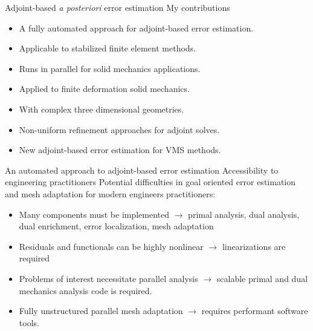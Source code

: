 \documentclass[fleqn]{beamer}
\begin{document}
\begin{frame}{Adjoint-based \emph{a posteriori} error estimation}
{My contributions}
\begin{itemize}
\item A fully automated approach for adjoint-based error estimation.
\item Applicable to stabilized finite element methods.
\item Runs in parallel for solid mechanics applications.
\item Applied to finite deformation solid mechanics.
\item With complex three dimensional geometries.
\item Non-uniform refinement approaches for adjoint solves.
\item New adjoint-based error estimation for VMS methods.
\end{itemize}
\end{frame}


\begin{frame}{An automated approach to adjoint-based error estimation}
{Accessibility to engineering practitioners}
Potential difficulties in goal oriented error estimation and
mesh adaptation for modern engineers practitioners:
\begin{itemize}
\item Many components must be implemented
$\rightarrow$ primal analysis, dual analysis,
dual enrichment, error localization, mesh adaptation
\item Residuals and functionals can be highly nonlinear
$\rightarrow$ linearizations are required
\item Problems of interest necessitate parallel analysis
$\rightarrow$ scalable primal and dual mechanics analysis code
is required.
\item Fully unstructured parallel mesh adaptation
$\rightarrow$ requires performant software tools.
\end{itemize}
\end{frame}

\end{document}
